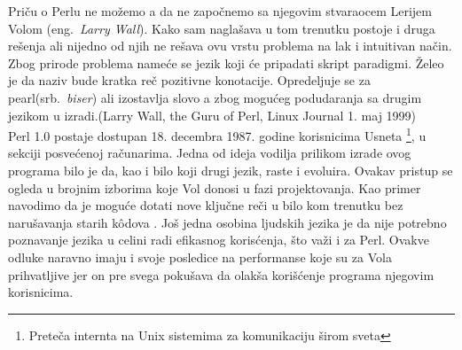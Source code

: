 \documentclass[a4paper]{article}
\begin{document}
Priču o Perlu ne možemo a da ne započnemo sa njegovim stvaraocem Lerijem Volom (eng.~{\em Larry Wall}). Kako sam naglašava u tom trenutku postoje i druga rešenja ali nijedno od njih ne rešava ovu vrstu problema na lak i intuitivan način. Zbog prirode problema nameće se jezik koji će pripadati skript paradigmi. Želeo je da naziv bude kratka reč pozitivne konotacije. Opredeljuje se za pearl(srb.~{\em biser}) ali izostavlja slovo a zbog mogućeg podudaranja sa drugim jezikom u izradi.(Larry Wall, the Guru of Perl, Linux Journal 1. maj 1999)\\

Perl 1.0 postaje dostupan 18. decembra 1987. godine korisnicima Usneta \footnote{Preteča internta na Unix sistemima za komunikaciju širom sveta}, u sekciji posvećenoj ra\v cunarima. Jedna od ideja vodilja prilikom izrade ovog programa bilo je da, kao i bilo koji drugi jezik, raste i evoluira. Ovakav pristup se ogleda u brojnim izborima koje Vol donosi u fazi projektovanja. Kao primer navodimo da je moguće  dotati nove ključne reči u bilo kom trenutku bez narušavanja starih k\^{o}dova \cite{id}. Još jedna osobina ljudskih jezika je da nije potrebno poznavanje jezika u celini radi efikasnog korisćenja, \v sto važi i za Perl. Ovakve odluke naravno imaju i svoje posledice na performanse koje su za Vola prihvatljive jer on pre svega pokušava da olakša korišćenje programa njegovim korisnicima.\\
\end{document}
